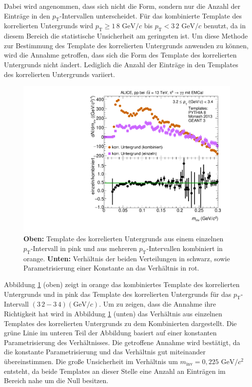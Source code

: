 Dabei wird angenommen, dass sich nicht die Form, sondern nur die Anzahl der Einträge in den $p_\text{T}$-Intervallen unterscheidet.  
Für das kombinierte Template des korrelierten Untergrunds wird $p_\text{T} \geq 1\,8\text{ GeV}/c$ bis $p_\text{T} < 3\,2\text{ GeV}/c$ benutzt, da in diesem Bereich die statistische Unsicherheit am geringsten ist.
Um diese Methode zur Bestimmung des Template des korrelierten Untergrunds anwenden zu können, wird die Annahme getroffen, dass sich die Form des Template des korrelierten Untergrunds nicht ändert.
Lediglich die Anzahl der Einträge in den Templates des korrelierten Untergrunds variiert.
\begin{figure}[t!]
\centering
\includegraphics[width=.7\linewidth]{BackgroundWithRatio10_Data_2016.pdf}
\caption{\textbf{Oben:} Template des korrelierten Untergrunds aus einem einzelnen $p_\text{T}$-Intervall in pink und aus mehreren $p_\text{T}$-Intervallen kombiniert in orange.
\textbf{Unten:} Verhältnis der beiden Verteilungen in schwarz, sowie Parametrisierung einer Konstante an das Verhältnis in rot.}
\label{fig:BkgTempRatio}
\end{figure}
\newline
Abbildung \ref{fig:BkgTempRatio} (oben) zeigt in orange das kombiniertes Template des korrelierten Untergrunds und in pink das Template des korrelierten Untergrunds für das $p_\text{T}$-Intervall $(3\,2 - 3\,4) (\text{GeV/}c)$.
Um zu zeigen, dass die Annahme ihre Richtigkeit hat wird in Abbildung \ref{fig:BkgTempRatio} (unten) das Verhältnis aus einzelnen Templates des korrelierten Untergrunds zu dem Kombinierten dargestellt.
Die grüne Linie im unteren Teil der Abbildung basiert auf einer konstanten Parametrisierung des Verhältnisses.
Die getroffene Annahme wird bestätigt, da die konstante Parametrisierung und das Verhältnis gut miteinander übereinstimmen.
Die große Unsicherheit im Verhältnis um $m_\text{inv} = 0,225\text{ GeV}/c^{2}$ entsteht, da beide Templates an dieser Stelle eine Anzahl an Einträgen im Bereich nahe um die Null besitzen.
